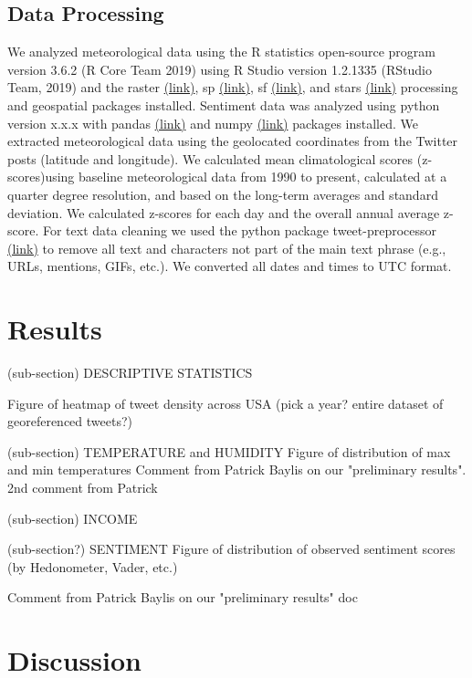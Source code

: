\documentclass{article}
\begin{document}
\subsection{Data Processing}
We analyzed meteorological data using the R statistics open-source program version 3.6.2  (R Core Team 2019) using R Studio version 1.2.1335 (RStudio Team, 2019) and the raster \href{https://www.rdocumentation.org/packages/raster/versions/3.3-13}{(link)}, sp \href{https://cran.r-project.org/web/packages/sp/index.html}{(link)}, sf \href{https://cran.r-project.org/web/packages/sf/index.html}{(link)}, and stars \href{https://cran.r-project.org/web/packages/stars/index.html}{(link)} processing and geospatial packages installed. Sentiment data was analyzed using python version x.x.x with pandas \href{https://pandas.pydata.org/}{(link)} and numpy \href{https://numpy.org/}{(link)} packages installed. We extracted meteorological data using the geolocated coordinates from the Twitter posts (latitude and longitude). We calculated mean climatological scores (z-scores)using baseline meteorological data from 1990 to present, calculated at a quarter degree resolution, and based on the long-term averages and standard deviation. We calculated z-scores for each day and the overall annual average z-score. For text data cleaning we used the python package tweet-preprocessor \href{https://pypi.org/project/tweet-preprocessor/}{(link)} to remove all text and characters not part of the main text phrase (e.g., URLs, mentions, GIFs, etc.). We converted all dates and times to UTC format.

\section{Results}
(sub-section) DESCRIPTIVE STATISTICS

Figure of heatmap of tweet density across USA (pick a year? entire dataset of georeferenced tweets?)

(sub-section) TEMPERATURE and HUMIDITY
Figure of distribution of max and min temperatures
Comment from Patrick Baylis on our "preliminary results". 2nd comment from Patrick

(sub-section) INCOME

(sub-section?) SENTIMENT
Figure of distribution of observed sentiment scores (by Hedonometer, Vader, etc.)

Comment from Patrick Baylis on our "preliminary results" doc


\section{Discussion}
\end{document}
